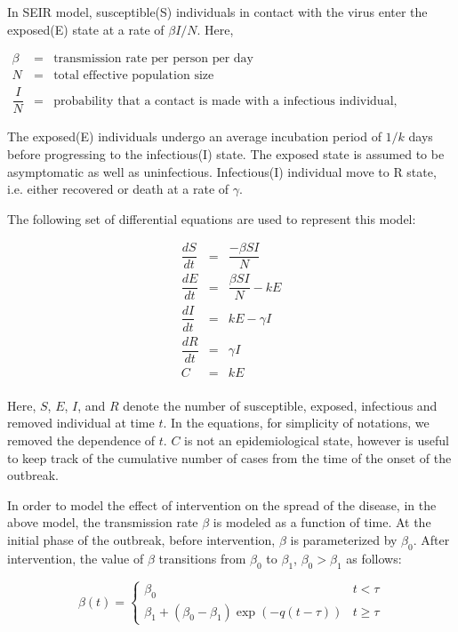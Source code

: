\documentclass[10pt, journal,onecolumn]{IEEEtran}
\begin{document}
In SEIR model, susceptible(S) individuals in contact with the virus enter the exposed(E) state at a rate of $\beta I / N$. Here,

\begin{eqnarray*}
\beta &=& \text{transmission rate per person per day}\\
N &=& \text{total effective population size}\\
\dfrac{I}{N} &=& \text{probability that a contact is made with a infectious individual, assuming random uniform mixing}
\end{eqnarray*}

The exposed(E) individuals undergo an average incubation period of $1/k$ days before progressing to the infectious(I) state. The exposed state is assumed to be asymptomatic as well as uninfectious. Infectious(I) individual move to R state, i.e. either recovered or death at a rate of $\gamma$.

The following set of differential equations are used to represent this model:

\begin{eqnarray}
\label{Eq:SEIR}
\dfrac{dS}{dt}	&=&	\dfrac{-\beta SI}{N}\nonumber\\
\dfrac{dE}{dt}	&=&	\dfrac{\beta SI}{N}-kE\nonumber\\
\dfrac{dI}{dt}	&=&	kE-\gamma I\nonumber\\
\dfrac{dR}{dt}	&=&	\gamma I\nonumber\\
C	&=&	kE\nonumber\\
 \end{eqnarray}
 
 Here, $S$, $E$, $I$, and $R$ denote the number of susceptible, exposed, infectious and removed individual at time $t$. In the equations, for simplicity of notations, we removed the dependence of $t$. $C$ is not an epidemiological state, however is useful to keep track of the cumulative number of cases from the time of the onset of the outbreak.
 
 In order to model the effect of intervention on the spread of the disease, in the above model, the transmission rate $\beta$ is modeled as a function of time. At the initial phase of the outbreak, before intervention, $\beta$ is parameterized by $\beta_0$. After intervention, the value of $\beta$ transitions from $\beta_0$ to $\beta_1$, $\beta_0>\beta_1$ as follows:
 
 \[
\beta(t)=\begin{cases}
\beta_{0} & t<\tau\\
\beta_{1}+(\beta_{0}-\beta_{1})\exp\left(-q\left(t-\tau\right)\right) & t\ge\tau
\end{cases}
\]
\end{document}
